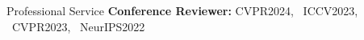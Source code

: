 \documentclass{template_2311} %
\begin{document}
\begin{rSection}{Professional Service} 
    {\bf Conference Reviewer:} {CVPR2024, ~ICCV2023, ~CVPR2023, ~NeurIPS2022}
\end{rSection}
\end{document}
